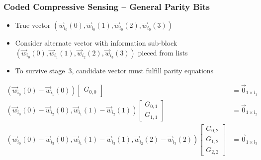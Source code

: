 \documentclass[10pt]{beamer}
\begin{document}
\begin{frame}
\frametitle{Coded Compressive Sensing -- General Parity Bits}
\begin{center}

\end{center}
\begin{itemize}
\item True vector $(\vec{w}_{i_0}(0), \vec{w}_{i_0}(1), \vec{w}_{i_0}(2), \vec{w}_{i_0}(3))$
\item Consider alternate vector with information sub-block $(\vec{w}_{i_0}(0), \vec{w}_{i_1}(1), \vec{w}_{i_2}(2), \vec{w}_{i_3}(3))$ pieced from lists
\item To survive stage~3, candidate vector must fulfill parity equations
\end{itemize}
\begin{align*}
\left( \vec{w}_{i_0}(0) - \vec{w}_{i_1}(0) \right) \begin{bmatrix} G_{0,0} \end{bmatrix} &= \vec{0}_{1 \times l_1} \\
\left( \vec{w}_{i_0}(0) - \vec{w}_{i_2}(0), \vec{w}_{i_1}(1) - \vec{w}_{i_2}(1) \right)
\begin{bmatrix} G_{0,1} \\ G_{1,1} \end{bmatrix}
&= \vec{0}_{1 \times l_2} \\
\left( \vec{w}_{i_0}(0) - \vec{w}_{i_3}(0), \vec{w}_{i_1}(1) - \vec{w}_{i_3}(1), \vec{w}_{i_2}(2) - \vec{w}_{i_3}(2) \right)
\begin{bmatrix} G_{0,2} \\ G_{1,2} \\ G_{2,2} \end{bmatrix}
&= \vec{0}_{1 \times l_3}
\end{align*}
\end{frame}
\end{document}
